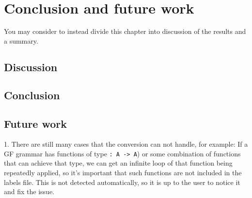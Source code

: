 \chapter{Conclusion and future work}

You may consider to instead divide this chapter into discussion of the results and a summary. 

\section{Discussion}

\section{Conclusion}

\section{Future work}

1. There are still many cases that the conversion can not handle, for example: If a GF grammar has functions of type \lstinline{: A -> A}) or some combination of functions that can achieve that type, we can get an infinite loop of that function being repeatedly applied, so it's important that such functions are not included in the labels file. This is not detected automatically, so it is up to the user to notice it and fix the issue.